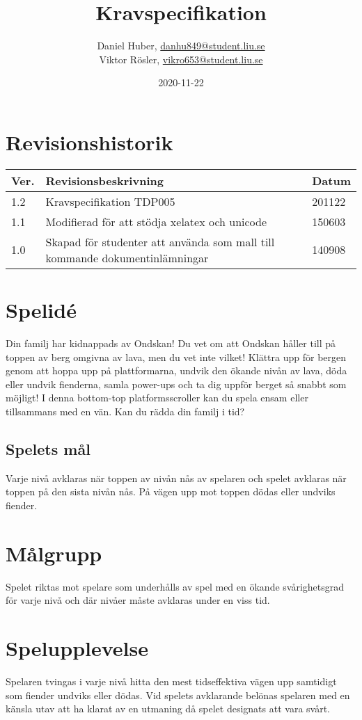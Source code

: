 \documentclass{TDP005mall}
\author{Daniel Huber, \url{danhu849@student.liu.se}\\
  Viktor Rösler, \url{vikro653@student.liu.se}}
\title{Kravspecifikation}
\date{2020-11-22}
\begin{document}
\projectpage
\tableofcontents
\newpage
\section{Revisionshistorik}
\begin{table}[!h]
\begin{tabularx}{\linewidth}{|l|X|l|}
\hline
  Ver. & Revisionsbeskrivning & Datum \\\hline
1.2 & Kravspecifikation TDP005 & 201122 \\\hline
1.1 & Modifierad för att stödja xelatex och unicode & 150603 \\\hline
1.0 & Skapad för studenter att använda som mall till
kommande dokumentinlämningar & 140908 \\\hline
\end{tabularx}
\end{table}


\section{Spelid\'{e} }%
Din familj har kidnappads av Ondskan! Du vet om att Ondskan håller till på toppen av berg omgivna av lava, men du vet inte vilket! Klättra upp för bergen genom att hoppa upp på plattformarna, undvik den ökande nivån av lava, döda eller undvik fienderna, samla power-ups och ta dig uppför berget så snabbt som möjligt! I denna bottom-top platformsscroller kan du spela ensam eller tillsammans med en vän. Kan du rädda din familj i tid?

\subsection{Spelets mål}
Varje nivå avklaras när toppen av nivån nås av spelaren och spelet avklaras när toppen på den sista nivån nås. På vägen upp mot toppen dödas eller undviks fiender. 

\section{Målgrupp}%
Spelet riktas mot spelare som underhålls av spel med en ökande svårighetsgrad för varje nivå och där nivåer måste avklaras under en viss tid. 

\section{Spelupplevelse}%
Spelaren tvingas i varje nivå hitta den mest tidseffektiva vägen upp samtidigt som fiender undviks eller dödas. Vid spelets avklarande belönas spelaren med en känsla utav att ha klarat av en utmaning då spelet designats att vara svårt.
\end{document}
